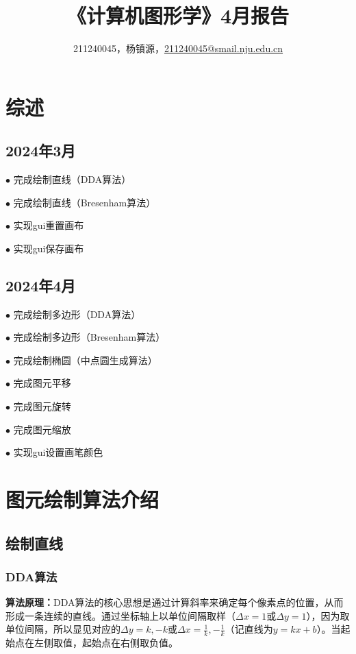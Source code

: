 \documentclass[a4paper,UTF8]{article}
\theoremstyle{definition}
\begin{document}
\title{\textbf{《计算机图形学》4月报告}}
\author{211240045，杨镇源，\href{mailto:211240045@smail.nju.edu.cn}{211240045@smail.nju.edu.cn}}
\maketitle
\tableofcontents 
\newpage
\section{综述}

\subsection{2024年3月}

$\bullet$ 完成绘制直线（DDA算法）

$\bullet$ 完成绘制直线（Bresenham算法）

$\bullet$ 实现gui重置画布

$\bullet$ 实现gui保存画布

\subsection{2024年4月}

$\bullet$ 完成绘制多边形（DDA算法）

$\bullet$ 完成绘制多边形（Bresenham算法）

$\bullet$ 完成绘制椭圆（中点圆生成算法）

$\bullet$ 完成图元平移

$\bullet$ 完成图元旋转

$\bullet$ 完成图元缩放

$\bullet$ 实现gui设置画笔颜色

\section{图元绘制算法介绍}

\subsection{绘制直线}

\subsubsection{DDA算法}

\textbf{算法原理：}DDA算法的核心思想是通过计算斜率来确定每个像素点的位置，从而形成一条连续的直线。通过坐标轴上以单位间隔取样（$\Delta x = 1$或$\Delta y = 1$），因为取单位间隔，所以显见对应的$\Delta y = k, -k$或$\Delta x = \frac{1}{k},-\frac{1}{k}$（记直线为$y=kx+b$）。当起始点在左侧取值，起始点在右侧取负值。
\end{document}
